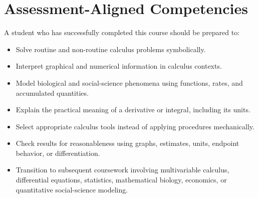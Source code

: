 \documentclass[11pt]{article}
\begin{document}
\section{Assessment-Aligned Competencies}

A student who has successfully completed this course should be prepared to:

\begin{itemize}
    \item Solve routine and non-routine calculus problems symbolically.
    \item Interpret graphical and numerical information in calculus contexts.
    \item Model biological and social-science phenomena using functions, rates, and accumulated quantities.
    \item Explain the practical meaning of a derivative or integral, including its units.
    \item Select appropriate calculus tools instead of applying procedures mechanically.
    \item Check results for reasonableness using graphs, estimates, units, endpoint behavior, or differentiation.
    \item Transition to subsequent coursework involving multivariable calculus, differential equations, statistics, mathematical biology, economics, or quantitative social-science modeling.
\end{itemize}
\end{document}
